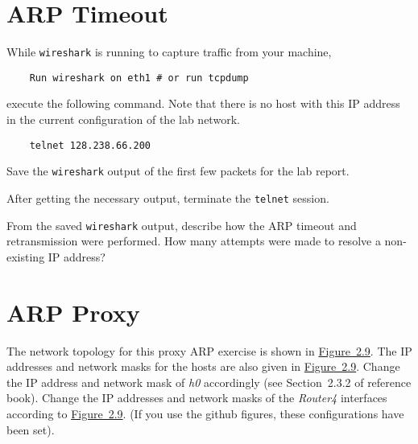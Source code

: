 \documentclass{UTNetLab}
\begin{document}
\section{ARP Timeout}
    While \lstinline{wireshark} is running to capture traffic from your machine,
    
    \begin{lstlisting}
    Run wireshark on eth1 # or run tcpdump
    \end{lstlisting}
    
execute the following command. Note that there is no host with this IP address in the current configuration of the lab network.
    
    \begin{lstlisting}
    telnet 128.238.66.200
    \end{lstlisting}
    

    Save the \lstinline{wireshark} output of the first few packets for the lab report.

    After getting the necessary output, terminate the \lstinline{telnet} session.
    \begin{report}
        \item From the saved \lstinline{wireshark} output, describe how the ARP timeout and retransmission were performed.
            How many attempts were made to resolve a non-existing IP address?
    \end{report}

\section{ARP Proxy}
    The network topology for this proxy ARP exercise is shown in \hyperref[fig:2.9]{Figure~2.9}.
    The IP addresses and network masks for the hosts are also given in \hyperref[fig:2.9]{Figure~2.9}.
    Change the IP address and network mask of \textit{h0} accordingly (see Section~2.3.2 of reference book).
    Change the IP addresses and network masks of the \textit{Router4} interfaces according to \hyperref[fig:2.9]{Figure~2.9}. (If you use the github figures, these configurations have been set).
    
\end{document}
